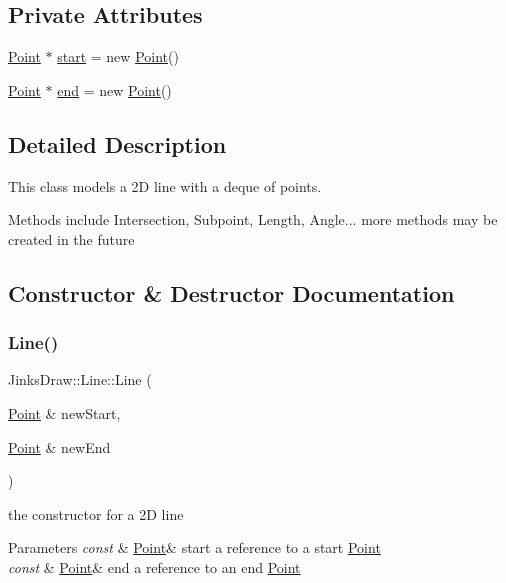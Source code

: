 \subsection*{Private Attributes}
\begin{DoxyCompactItemize}
\item 
\mbox{\hyperlink{class_jinks_draw_1_1_point}{Point}} $\ast$ \mbox{\hyperlink{class_jinks_draw_1_1_line_a697fccb64f32b900f86dbc89ac69fec3}{start}} = new \mbox{\hyperlink{class_jinks_draw_1_1_point}{Point}}()
\item 
\mbox{\hyperlink{class_jinks_draw_1_1_point}{Point}} $\ast$ \mbox{\hyperlink{class_jinks_draw_1_1_line_a6c04e4d06b7c8bafff608b1ffae6169b}{end}} = new \mbox{\hyperlink{class_jinks_draw_1_1_point}{Point}}()
\end{DoxyCompactItemize}


\subsection{Detailed Description}
This class models a 2D line with a deque of points. 

Methods include Intersection, Subpoint, Length, Angle... more methods may be created in the future 

\subsection{Constructor \& Destructor Documentation}
\mbox{\label{class_jinks_draw_1_1_line_a0a01ff362d3d5cb6de257cdc59fdbd7a}} 
\subsubsection{\texorpdfstring{Line()}{Line()}}
{\footnotesize\ttfamily Jinks\+Draw\+::\+Line\+::\+Line (\begin{DoxyParamCaption}\item[{\mbox{\hyperlink{class_jinks_draw_1_1_point}{Point}} \&}]{new\+Start,  }\item[{\mbox{\hyperlink{class_jinks_draw_1_1_point}{Point}} \&}]{new\+End }\end{DoxyParamCaption})}



the constructor for a 2D line 


\begin{DoxyParams}{Parameters}
{\em const} & \mbox{\hyperlink{class_jinks_draw_1_1_point}{Point}}\& start a reference to a start \mbox{\hyperlink{class_jinks_draw_1_1_point}{Point}} \\
\hline
{\em const} & \mbox{\hyperlink{class_jinks_draw_1_1_point}{Point}}\& end a reference to an end \mbox{\hyperlink{class_jinks_draw_1_1_point}{Point}} \\
\hline
\end{DoxyParams}


